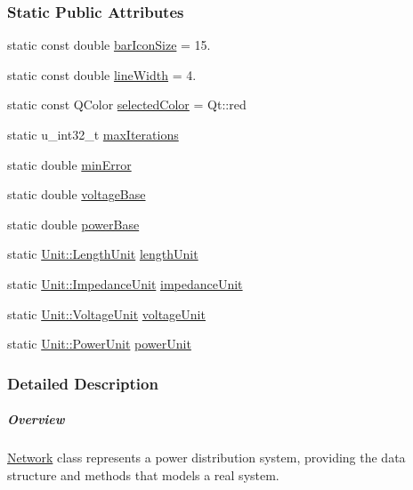 \subsubsection*{Static Public Attributes}
\begin{DoxyCompactItemize}
\item 
static const double \hyperlink{group___graphics_gaa334bbc93b3fde219840e95e23198b53}{bar\+Icon\+Size} = 15.
\item 
static const double \hyperlink{group___graphics_ga3f810634c9908d62d33a1ab09a76c147}{line\+Width} = 4.
\item 
static const Q\+Color \hyperlink{group___graphics_gaa9e21b8e2a24b0495e776a51e1aeed94}{selected\+Color} = Qt\+::red
\item 
static u\+\_\+int32\+\_\+t \hyperlink{class_network_a1a818069626eb82d58e3974a5b3492a6}{max\+Iterations}
\item 
static double \hyperlink{class_network_abcdc973129d3dda7572b7a1c388da1b5}{min\+Error}
\item 
static double \hyperlink{class_network_a7c1e79d9ac69df9a69f24eaf092fd5e5}{voltage\+Base}
\item 
static double \hyperlink{class_network_a74bb7aa495d422f1f092acdf958df989}{power\+Base}
\item 
static \hyperlink{class_unit_a8c8921f7b225ad6063b1cb573425b9a0}{Unit\+::\+Length\+Unit} \hyperlink{class_network_ae46c0e2bf39b343875e3c69066fe2652}{length\+Unit}
\item 
static \hyperlink{class_unit_a3747e779c805df24a71961290be3fbdf}{Unit\+::\+Impedance\+Unit} \hyperlink{class_network_a5f3d72699a723c64a89d22e34df708ff}{impedance\+Unit}
\item 
static \hyperlink{class_unit_a55b07dfa9457e1eca2c7194fe0cfc3c1}{Unit\+::\+Voltage\+Unit} \hyperlink{class_network_acde031ef95f5c05565ee35769f2ed89e}{voltage\+Unit}
\item 
static \hyperlink{class_unit_ace265ae255370ccacfd5370337572c3b}{Unit\+::\+Power\+Unit} \hyperlink{class_network_a9504015bc566f4a3d3b4d4a86000293b}{power\+Unit}
\end{DoxyCompactItemize}


\subsubsection{Detailed Description}
\subparagraph*{Overview}

\hyperlink{class_network}{Network} class represents a power distribution system, providing the data structure and methods that models a real system.

